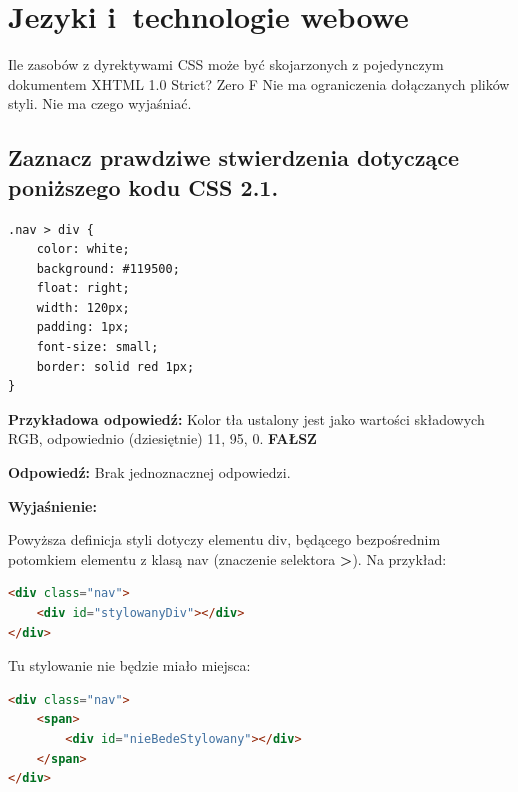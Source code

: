 \chapter{Jezyki i~technologie webowe}
\PartialToc

\answer
{Ile zasobów z dyrektywami CSS może być skojarzonych z pojedynczym dokumentem XHTML 1.0 Strict?}
{Zero}
{F}
{Nie ma ograniczenia dołączanych plików styli.}
{Nie ma czego wyjaśniać.}


\section{Zaznacz prawdziwe stwierdzenia dotyczące poniższego kodu CSS 2.1.}
\begin{lstlisting}[language=html]
.nav > div {
	color: white;
	background: #119500;
	float: right;
	width: 120px;
	padding: 1px;
	font-size: small;
	border: solid red 1px;
}
\end{lstlisting}

\noindent
{\textbf{Przykładowa odpowiedź:}}
Kolor tła ustalony jest jako wartości składowych RGB, odpowiednio (dziesiętnie) 11, 95, 0.
\textbf{FAŁSZ}

\vspace{0.4cm}
\noindent
\textbf{Odpowiedź:}
Brak jednoznacznej odpowiedzi.

\vspace{0.4cm}
\noindent
\textbf{Wyjaśnienie:}

Powyższa definicja styli dotyczy elementu div, będącego bezpośrednim potomkiem elementu z klasą nav (znaczenie selektora \textbf{>}).
Na przykład:
\begin{lstlisting}[language=html]
<div class="nav">
	<div id="stylowanyDiv"></div>
</div>
\end{lstlisting}

Tu stylowanie nie będzie miało miejsca:

\begin{lstlisting}[language=html]
<div class="nav">
	<span>
		<div id="nieBedeStylowany"></div>
	</span>
</div>
\end{lstlisting}


